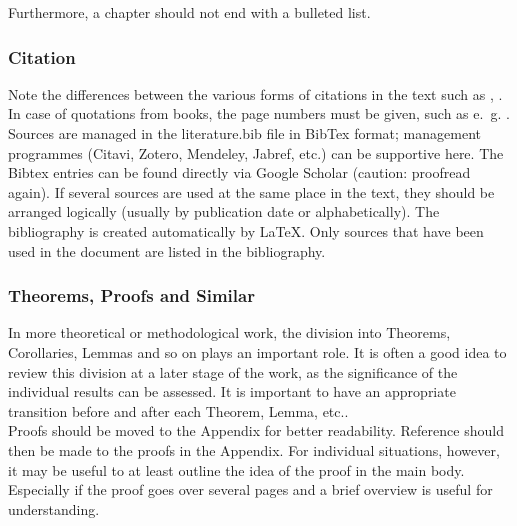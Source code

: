 Furthermore, a chapter should not end with a bulleted list.

\subsubsection{Citation}
Note the differences between the various forms of citations in the text such as \citealp{kaplan1958nonparametric}, \citep{kaplan1958nonparametric}. In case of quotations from books, the page numbers must be given, such as e.~g. \citet[p.~123]{friedman2017elements}. Sources are managed in the literature.bib file in BibTex format; management programmes (Citavi, Zotero, Mendeley, Jabref, etc.) can be supportive here. The Bibtex entries can be found directly via Google Scholar (caution: proofread again).
If several sources are used at the same place in the text, they should be arranged logically (usually by publication date or alphabetically). The bibliography is created automatically by \LaTeX. Only sources that have been used in the document are listed in the bibliography.


\subsubsection{Theorems, Proofs and Similar}
In more theoretical or methodological work, the division into Theorems, Corollaries, Lemmas and so on plays an important role. It is often a good idea to review this division at a later stage of the work, as the significance of the individual results can be assessed. It is important to have an appropriate transition before and after each Theorem, Lemma, etc.. \\
Proofs should be moved to the Appendix for better readability. Reference should then be made to the proofs in the Appendix. For individual situations, however, it may be useful to at least outline the idea of the proof in the main body. Especially if the proof goes over several pages and a brief overview is useful for understanding.  
